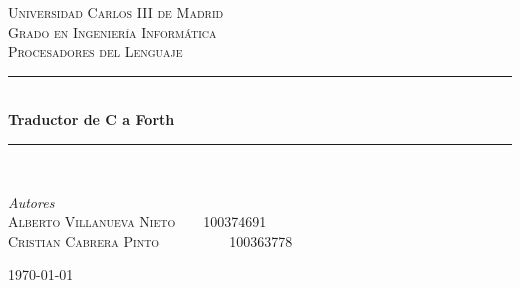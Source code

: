 \documentclass[11pt,spanish]{article}
\begin{document}
	
	
	
		\begin{titlepage} %
		
		\newcommand{\HRule}{\rule{\linewidth}{0.5mm}} %
		
		\center %
		
		
		\textsc{\LARGE Universidad Carlos III de Madrid}\\[1.5cm] %
		
		\textsc{\Large Grado en Ingeniería Informática}\\[0.5cm] %
		
		\textsc{\large Procesadores del Lenguaje}\\[0.5cm] %
		
		
		\HRule\\[0.4cm]
		
		{\huge\bfseries Traductor de C a Forth}\\[0.4cm] %
		
		\HRule\\[1.5cm]
		
		
		\begin{minipage}{0.7\textwidth}
			\begin{flushleft}
				\large
				\textit{Autores}\\
				\textsc{Alberto Villanueva Nieto\ \ \ \ 100374691}\\
				\textsc{Cristian Cabrera Pinto\ \ \ \ \ \ \ \ \ \ 100363778}
			\end{flushleft}
		\end{minipage}
	
		
		\vfill\vfill\vfill %
		
		{\large\today} %
		
		\vfill %
		
		\end{titlepage}
	\newpage
		\tableofcontents
		\newpage
	
\end{document}
